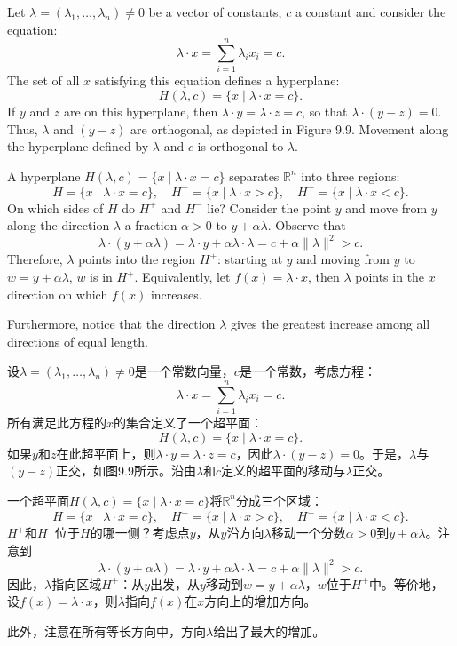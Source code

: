 \begin{original}
Let $\lambda = (\lambda_1, \dots, \lambda_n) \ne 0$ be a vector of constants, $c$ a constant and consider the equation:
\[
\lambda \cdot x = \sum_{i=1}^{n} \lambda_i x_i = c.
\]
The set of all $x$ satisfying this equation defines a hyperplane:
\[
H(\lambda, c) = \{x \mid \lambda \cdot x = c\}.
\]
If $y$ and $z$ are on this hyperplane, then $\lambda \cdot y = \lambda \cdot z = c$, so that $\lambda \cdot (y - z) = 0$. Thus, $\lambda$ and $(y - z)$ are orthogonal, as depicted in Figure 9.9. Movement along the hyperplane defined by $\lambda$ and $c$ is orthogonal to $\lambda$.

A hyperplane $H(\lambda, c) = \{x \mid \lambda \cdot x = c\}$ separates $\mathbb{R}^n$ into three regions:
\[
H = \{x \mid \lambda \cdot x = c\}, \quad H^+ = \{x \mid \lambda \cdot x > c\}, \quad H^- = \{x \mid \lambda \cdot x < c\}.
\]
On which sides of $H$ do $H^+$ and $H^-$ lie? Consider the point $y$ and move from $y$ along the direction $\lambda$ a fraction $\alpha > 0$ to $y + \alpha\lambda$. Observe that
\[
\lambda \cdot (y + \alpha\lambda) = \lambda \cdot y + \alpha\lambda \cdot \lambda = c + \alpha\|\lambda\|^2 > c.
\]
Therefore, $\lambda$ points into the region $H^+$: starting at $y$ and moving from $y$ to $w = y + \alpha\lambda$, $w$ is in $H^+$. Equivalently, let $f(x) = \lambda \cdot x$, then $\lambda$ points in the $x$ direction on which $f(x)$ increases.

Furthermore, notice that the direction $\lambda$ gives the greatest increase among all directions of equal length.
\end{original}
\begin{translation}
设$\lambda = (\lambda_1, \dots, \lambda_n) \ne 0$是一个常数向量，$c$是一个常数，考虑方程：
\[
\lambda \cdot x = \sum_{i=1}^{n} \lambda_i x_i = c.
\]
所有满足此方程的$x$的集合定义了一个超平面：
\[
H(\lambda, c) = \{x \mid \lambda \cdot x = c\}.
\]
如果$y$和$z$在此超平面上，则$\lambda \cdot y = \lambda \cdot z = c$，因此$\lambda \cdot (y - z) = 0$。于是，$\lambda$与$(y - z)$正交，如图9.9所示。沿由$\lambda$和$c$定义的超平面的移动与$\lambda$正交。

一个超平面$H(\lambda, c) = \{x \mid \lambda \cdot x = c\}$将$\mathbb{R}^n$分成三个区域：
\[
H = \{x \mid \lambda \cdot x = c\}, \quad H^+ = \{x \mid \lambda \cdot x > c\}, \quad H^- = \{x \mid \lambda \cdot x < c\}.
\]
$H^+$和$H^-$位于$H$的哪一侧？考虑点$y$，从$y$沿方向$\lambda$移动一个分数$\alpha > 0$到$y + \alpha\lambda$。注意到
\[
\lambda \cdot (y + \alpha\lambda) = \lambda \cdot y + \alpha\lambda \cdot \lambda = c + \alpha\|\lambda\|^2 > c.
\]
因此，$\lambda$指向区域$H^+$：从$y$出发，从$y$移动到$w = y + \alpha\lambda$，$w$位于$H^+$中。等价地，设$f(x) = \lambda \cdot x$，则$\lambda$指向$f(x)$在$x$方向上的增加方向。

此外，注意在所有等长方向中，方向$\lambda$给出了最大的增加。
\end{translation}

